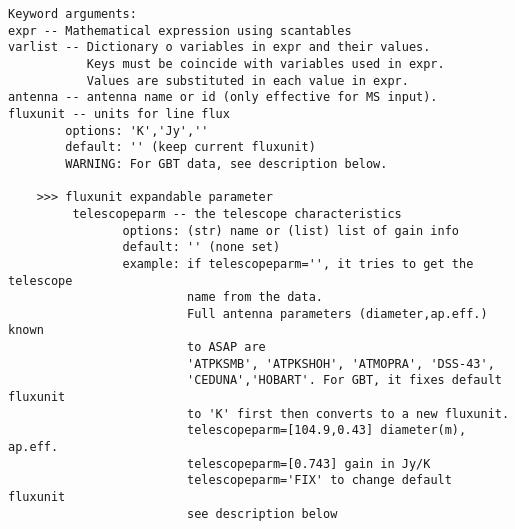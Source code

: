 \begin{verbatim}
Keyword arguments:
expr -- Mathematical expression using scantables 
varlist -- Dictionary o variables in expr and their values.
           Keys must be coincide with variables used in expr.
           Values are substituted in each value in expr.
antenna -- antenna name or id (only effective for MS input).
fluxunit -- units for line flux
        options: 'K','Jy',''
        default: '' (keep current fluxunit)
        WARNING: For GBT data, see description below.
     
    >>> fluxunit expandable parameter
         telescopeparm -- the telescope characteristics
                options: (str) name or (list) list of gain info
                default: '' (none set)
                example: if telescopeparm='', it tries to get the telescope
                         name from the data.
                         Full antenna parameters (diameter,ap.eff.) known
                         to ASAP are
                         'ATPKSMB', 'ATPKSHOH', 'ATMOPRA', 'DSS-43',
                         'CEDUNA','HOBART'. For GBT, it fixes default fluxunit
                         to 'K' first then converts to a new fluxunit.
                         telescopeparm=[104.9,0.43] diameter(m), ap.eff.
                         telescopeparm=[0.743] gain in Jy/K
                         telescopeparm='FIX' to change default fluxunit
                         see description below


\end{verbatim}
